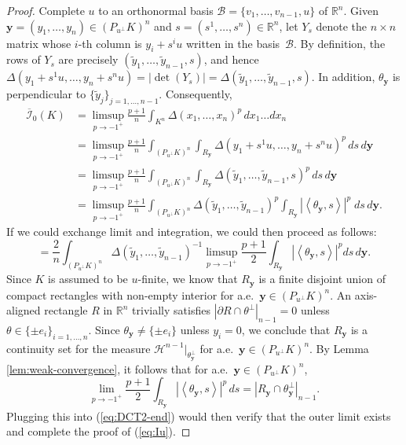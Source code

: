 \documentclass[11pt]{article}
\theoremstyle{definition}
\theoremstyle{proof}
\DeclareMathOperator{\+}{\mathop{\tilde{+}}}
\newcommand{\abs}[1]{\left\vert#1\right\vert}
\newcommand{\scalar}[1]{\left \langle #1 \right \rangle}
\newcommand{\R}{\mathbb{R}}
\newcommand{\Y}{Y}\newcommand{\E}{\mathbb{E}}
\renewcommand{\H}{\mathcal{H}}
\newcommand{\I}{\mathcal{I}}
\newcommand{\y}{\mathbf{y}}
\numberwithin{equation}{section}
\numberwithin{equation}{section}
\begin{document}
\begin{proof}
Complete $u$ to an orthonormal basis $\mathcal{B} = \{v_1,\ldots,v_{n-1}, u\}$ of $\R^n$. Given 
$\y = (y_1,\ldots,y_n) \in (P_{u^\perp} K)^n$ and $s = (s^1,\ldots,s^n) \in \R^n$, 
let $\Y_s$ denote the $n\times n$ matrix whose $i$-th column is $y_i + s^i u$ written in the basis~$\mathcal{B}$. By definition, the rows of $\Y_s$ are precisely $(\tilde y_1,\ldots,\tilde y_{n-1},s)$, and hence $\Delta(y_1 + s^1 u, \ldots, y_n + s^n u) = \abs{\det(\Y_s)} = \Delta(\tilde y_1, \ldots , \tilde y_{n-1}, s)$. 
In addition, $\theta_\y$  is perpendicular to $\{\tilde y_j\}_{j=1,\ldots,n-1}$. Consequently,
\begin{align}
\nonumber \overline{\I}_0(K) & = \limsup_{p \rightarrow -1^+} \frac{p+1}{n} \int_{K^n} \Delta(x_1,\ldots,x_n)^p \, dx_1 \ldots dx_n \\
\nonumber & = \limsup_{p \rightarrow -1^+} \frac{p+1}{n} \int_{(P_{u^{\perp}} K)^n} \int_{R_{\y}} \Delta(y_1 + s^1 u, \ldots, y_n + s^n u)^p \, ds \, d\y  \\
\nonumber  &= \limsup_{p \rightarrow -1^+} \frac{p+1}{n}\int_{(P_{u^{\perp}} K)^n} \int_{R_{\y}} \Delta(\tilde y_1, \ldots , \tilde y_{n-1}, s)^p \, ds \, d\y \\
\label{eq:DCT2} & = \limsup_{p \rightarrow -1^+} \frac{p+1}{n} \int_{(P_{u^{\perp}} K)^n}  \Delta(\tilde y_1, \ldots , \tilde y_{n-1})^p \int_{R_{\y}}  \abs{\scalar{\theta_\y,s}}^p\;  ds \, d\y .
\end{align}
If we could exchange limit and integration, we could then proceed as follows:
\begin{equation} \label{eq:DCT2-end}
= \frac{2}{n} \int_{(P_{u^{\perp}} K)^n}  \Delta(\tilde y_1, \ldots , \tilde y_{n-1})^{-1} \limsup_{p \rightarrow -1^+} \frac{p+1}{2}\int_{R_{\y}}  \abs{\scalar{\theta_\y,s}}^p ds \, d\y . 
\end{equation}
Since $K$ is assumed to be $u$-finite, we know that $R_\y$ is a finite disjoint union of compact rectangles with non-empty interior for a.e.~$\y \in (P_{u^{\perp}} K)^n$. 
An axis-aligned rectangle $R$ in $\R^n$ trivially satisfies $|\partial R \cap \theta^{\perp}|_{n-1} = 0$ unless $\theta \in \{ \pm e_i \}_{i=1,\ldots,n}$. Since $\theta_\y \neq \{ \pm e_i \}$ unless $y_i = 0$, we conclude that $R_\y$ is a continuity set for the measure $\H^{n-1}|_{\theta_\y^{\perp}}$ for a.e.~$\y \in  (P_{u^{\perp}} K)^n$. By Lemma \ref{lem:weak-convergence}, it follows that for a.e.~$\y \in  (P_{u^{\perp}} K)^n$,
\[
\lim_{p \rightarrow -1^+} \frac{p+1}{2}\int_{R_{\y}}  \abs{\scalar{\theta_\y,s}}^p \, ds =  |R_\y \cap \theta_\y^{\perp}|_{n-1} .
\]
Plugging this into (\ref{eq:DCT2-end}) would then verify that the outer limit exists and complete the proof of (\ref{eq:Iu}). 


\end{proof}
\end{document}
